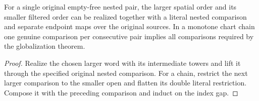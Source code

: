 \begin{proposition}
\label{hir:g8-joint-reordering-consecutive-charts}
\leanok
For a single original empty-free nested pair, the larger spatial
order and its smaller filtered order can be realized together with
a literal nested comparison and separate endpoint maps over the
original sources. In a monotone chart chain one genuine comparison
per consecutive pair implies all comparisons required by the
globalization theorem.
\end{proposition}
\begin{proof}
Realize the chosen larger word with its intermediate towers and
lift it through the specified original nested comparison.
For a chain, restrict the next larger comparison to the smaller
open and flatten its double literal restriction. Compose it with
the preceding comparison and induct on the index gap.
\end{proof}

